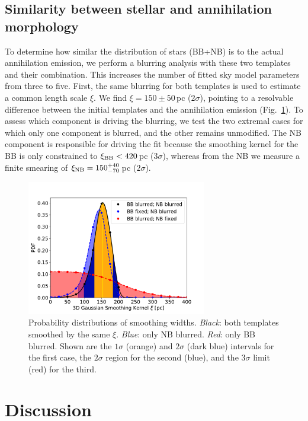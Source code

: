 \documentclass[doublespace,nopageskip]{VTthesis}
\begin{document}
\subsection{Similarity between stellar and annihilation morphology}\label{sec:blurring_analysis}
%
To determine how similar the distribution of stars (BB+NB) is to the actual annihilation emission, we perform a blurring analysis with these two templates and their combination.
%
This increases the number of fitted sky model parameters from three to five.
%
First, the same blurring for both templates is used to estimate a common length scale $\xi$.
%
We find $\xi = 150 \pm 50$\,pc ($2\sigma$), pointing to a resolvable difference between the initial templates and the annihilation emission (Fig. \,\ref{fig:blur}).
%
To assess which component is driving the blurring, we test the two extremal cases for which only one component is blurred, and the other remains unmodified.
%
The NB component is responsible for driving the fit because the smoothing kernel for the BB is only constrained to $\xi_{\rm BB} < 420$\,pc ($3\sigma$), whereas from the NB we measure a finite smearing of $\xi_{\rm NB} = 150^{+40}_{-70}$\,pc ($2\sigma$).

\begin{figure}[htb]
	\centering
	\includegraphics[width=0.7\textwidth,trim=0.0in 0.15in 0.4in 0.7in, clip=True]{Figures/511keV/Blurred_bulges3D_PDF_comparison.pdf}
	\caption{Probability distributions of smoothing widths. \textit{Black}: both templates smoothed by the same $\xi$. \textit{Blue}: only NB blurred. \textit{Red}: only BB blurred. Shown are the $1\sigma$ (orange) and $2\sigma$ (dark blue) intervals for the first case, the $2\sigma$ region for the second (blue), and the $3\sigma$ limit (red) for the third.} 
	\label{fig:blur}
\end{figure}


\section{Discussion}\label{sec:discussion_511}
%
\end{document}
